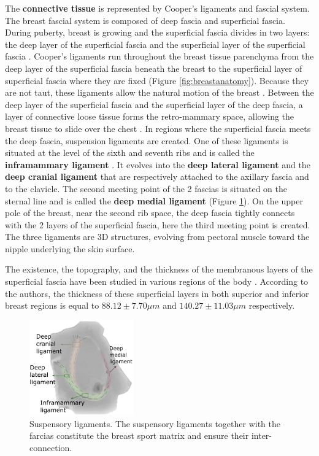 The \textbf{connective tissue} is represented by Cooper's ligaments and fascial system. The breast fascial system is composed of deep fascia and superficial fascia. During puberty, breast is growing and the superficial fascia divides in two layers: the deep layer of the superficial fascia and the superficial layer of the superficial fascia \citep{kopans2007breast}.  Cooper's ligaments run throughout the breast tissue parenchyma from the deep layer of the superficial fascia beneath the breast to the superficial layer of superficial fascia where they are fixed (Figure \ref{fig:breastanatomy}). Because they are not taut, these ligaments allow the natural motion of the breast \citep{clemente2011anatomy}. Between the deep layer of the superficial fascia and the superficial layer of the deep fascia, a layer of connective loose tissue forms the retro-mammary space, allowing the breast tissue to slide over the chest \citep{mugea2014aesthetic}. In regions where the superficial fascia meets the deep fascia, suspension ligaments are created. One of these ligaments is situated at the level of the sixth and seventh ribs and is called the \textbf{inframammary ligament} \citep{bayati_inframammary_1995}. It evolves into the \textbf{deep lateral ligament} and the \textbf{deep cranial ligament} that are respectively attached to the axillary fascia and to the clavicle. The second meeting point of the 2 fascias is situated on the sternal line and is called the \textbf{deep medial ligament} (Figure \ref{fig:suspensoryligaments}). On the upper pole of the breast, near the second rib space, the deep fascia tightly connects with the 2 layers of the superficial fascia, here the third meeting point is created. The three ligaments are 3D structures, evolving from pectoral muscle toward the nipple underlying the skin surface.


The existence, the topography, and the thickness of the membranous layers of the superficial fascia have been studied in various regions of the body \citep{abu_membranous_2006}. According to the authors, the thickness of these superficial layers in both superior and inferior breast regions is equal to $88.12 \pm 7.70 \mu m$ and $140.27 \pm 11.03 \mu m$ respectively.

\begin{figure}[!h]
\centering
\centerline{\includegraphics[width=0.4\textwidth,keepaspectratio]{figures/breastLigaments.png} }
\caption{Suspensory ligaments. The suspensory ligaments together with the farcias constitute the breast sport matrix and ensure their inter-connection.   \citep{mugea2014aesthetic}}
\label{fig:suspensoryligaments}
\end{figure}


